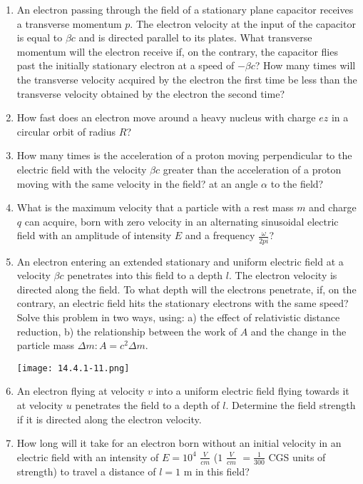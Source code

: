 \documentclass{article}
\begin{document}
\begin{enumerate}[label=14.4.\arabic*]
\item An electron passing through the field of a stationary plane capacitor receives a transverse momentum $p$. The electron velocity at the input of the capacitor is equal to $\beta c$ and is directed parallel to its plates. What transverse momentum will the electron receive if, on the contrary, the capacitor flies past the initially stationary electron at a speed of $-\beta c$? How many times will the transverse velocity acquired by the electron the first time be less than the transverse velocity obtained by the electron the second time?

\item How fast does an electron move around a heavy nucleus with charge $ez$ in a circular orbit of radius $R$?

\item How many times is the acceleration of a proton moving perpendicular to the electric field with the velocity $\beta c$ greater than the acceleration of a proton moving with the same velocity in the field? at an angle $\alpha$ to the field?

\item What is the maximum velocity that a particle with a rest mass $m$ and charge $q$ can acquire, born with zero velocity in an alternating sinusoidal electric field with an amplitude of intensity $E$ and a frequency $\frac{\omega}{2 pi}$?

\item An electron entering an extended stationary and uniform electric field at a velocity $\beta c$ penetrates into this field to a depth $l$. The electron velocity is directed along the field. To what depth will the electrons penetrate, if, on the contrary, an electric field hits the stationary electrons with the same speed? Solve this problem in two ways, using: a) the effect of relativistic distance reduction, b) the relationship between the work of $A$ and the change in the particle mass $\Delta m: A = c^2 \Delta m$.

\begin{center}
    \texttt{[image: 14.4.1-11.png]}
\end{center}

\item An electron flying at velocity $v$ into a uniform electric field flying towards it at velocity $u$ penetrates the field to a depth of $l$. Determine the field strength if it is directed along the electron velocity.

\item How long will it take for an electron born without an initial velocity in an electric field with an intensity of $E = 10^4$ $\frac{V}{cm}$ ($1$ $\frac{V}{cm}$ $= \frac{1}{300}$ CGS units of strength) to travel a distance of $l = 1$ m in this field?


\end{enumerate}
\end{document}

